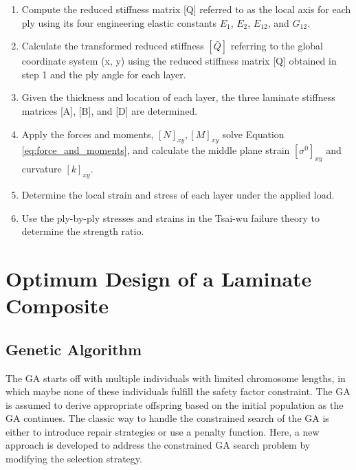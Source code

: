 \documentclass[Afour,sagev,times]{sagej}
\begin{document}
\begin{enumerate}
\item Compute the reduced stiffness matrix [Q] referred to as the local axis for each ply using its four engineering elastic constants $E_1 $, $E_2 $, $E_{12} $, and $G_{12} $.

\item Calculate the transformed reduced stiffness $[\bar{Q}] $ referring to the global coordinate system (x, y) using the reduced stiffness matrix [Q] obtained in step 1 and the ply angle for each layer.

\item  Given the thickness and location of each layer, the three laminate stiffness matrices [A], [B], and [D] are determined.

\item  Apply the forces and moments, $[N]_{xy}, [M]_{xy} $ solve
Equation \ref{eq:force_and_moments}, and calculate the middle plane strain $[\sigma ^{0}]_{xy} $ and curvature $[k]_{xy} $.

\item Determine the local strain and stress of each layer under the applied load.

\item  Use the ply-by-ply stresses and strains in the Tsai-wu failure theory to determine the strength ratio.
\end{enumerate}

\section{Optimum Design of a Laminate Composite}

\subsection{Genetic Algorithm}
The GA starts off with multiple individuals with limited chromosome lengths, in which maybe none of
these individuals fulfill the safety factor constraint. The GA is assumed to derive appropriate
offspring based on the initial population as the GA continues. The classic way to handle the constrained
search of the GA is either to introduce repair strategies or use a penalty function. Here, a new
approach is developed to address the constrained GA search problem by modifying the selection
strategy.
\end{document}
